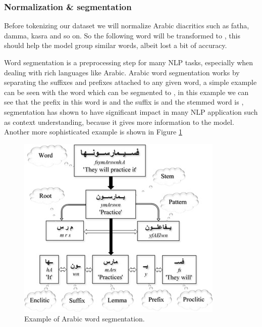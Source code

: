 \documentclass[12pt]{diazessay}
\begin{document}
            \subsubsection{Normalization \& segmentation}
            Before tokenizing our dataset we will normalize Arabic diacritics such as fatha, damma, kasra and so on. So the following word  
            will be transformed to , this should help the model group similar words, albeit lost a bit of accuracy.
            
            
            Word segmentation is a preprocessing step for many NLP tasks, especially when dealing with rich languages like Arabic. Arabic word segmentation works by separating the suffixes and prefixes attached to any given word, a simple example can be seen with the word  which can be segmented to , in this example we can see that the prefix in this word is  and the suffix is  and the stemmed word is , segmentation has shown to have signiﬁcant impact in many NLP application such as context understanding, because it gives more information to the model. Another more sophisticated example is shown in Figure \ref{fig:arabic_segmentation}
            
            \begin{figure}[h]
                \includegraphics[scale=1]{Figures/arabic_segmentation.png}
                \caption{Example of Arabic word segmentation.\cite{arabic_segmentation}}
                \label{fig:arabic_segmentation}
            \end{figure}
            
            
\end{document}
